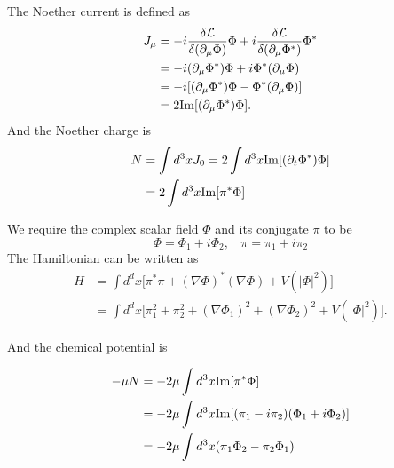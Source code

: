 \documentclass[12pt]{article}
\begin{document}
The Noether current is defined as
\begin{equation}
    \begin{split}
        J_\mu&=-i\frac{\delta\mathcal{L}}{\delta(\partial_\mu\Phi)}\Phi+
        i\frac{\delta\mathcal{L}}{\delta(\partial_\mu\Phi^*)}\Phi^*\\
        &=-i(\partial_\mu\Phi^*)\Phi+i\Phi^*(\partial_\mu\Phi)\\
        &=-i[(\partial_\mu\Phi^*)\Phi-\Phi^*(\partial_\mu\Phi)]\\
        &=2{\rm Im}[(\partial_\mu\Phi^*)\Phi].
    \end{split}
\end{equation}
And the Noether charge is 
\begin{equation}
    \begin{split}
        N&=\int d^3xJ_0=2\int d^3x{\rm Im}[(\partial_t\Phi^*)\Phi]\\
        &=2\int d^3x{\rm Im}[\pi^*\Phi]
    \end{split}
\end{equation}

We require the complex scalar field $\Phi$ and its conjugate $\pi$ to be 
\begin{equation*}
    \Phi=\Phi_1+i\Phi_2,\ \ \ \ \pi=\pi_1+i\pi_2
\end{equation*}
The Hamiltonian can be written as 
\begin{equation}
    \begin{split}
        H&=\int d^dx\big[\pi^*\pi+(\nabla\Phi)^*(\nabla\Phi)+V(|\Phi|^2)\big]\\
        &=\int d^dx\big[\pi_1^2+\pi_2^2+(\nabla\Phi_1)^2+(\nabla\Phi_2)^2+
        V(|\Phi|^2)\big].
    \end{split}
\end{equation}

And the chemical potential is 

\begin{equation}
    \begin{split}
        -\mu N&=-2\mu\int d^3x {\rm Im}[\pi^*\Phi]\\
        &=-2\mu\int d^3x {\rm Im}[(\pi_1-i\pi_2)(\Phi_1+i\Phi_2)]\\
        &=-2\mu\int d^3x(\pi_1\Phi_2-\pi_2\Phi_1)
    \end{split}
\end{equation}
\end{document}
